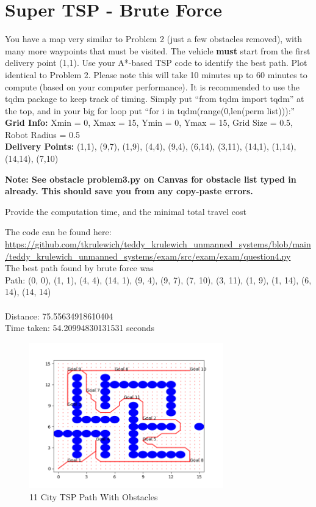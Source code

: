 \documentclass{article}
\begin{document}
\section{Super TSP - Brute Force}

You have a map very similar to Problem 2 (just a few obstacles removed),
with many more waypoints that must be visited. The vehicle \textbf{must} start from the first delivery point
(1,1). Use your A*-based TSP code to identify the best path. Plot identical to Problem 2. Please note
this will take 10 minutes up to 60 minutes to compute (based on your computer performance). It is
recommended to use the tqdm package to keep track of timing. Simply put “from tqdm import tqdm”
at the top, and in your big for loop put “for i in tqdm(range(0,len(perm list))):” \\

\bigskip
\noindent\textbf{Grid Info:} Xmin = 0, Xmax = 15, Ymin = 0, Ymax = 15, Grid Size = 0.5, Robot Radius = 0.5 \\
\textbf{Delivery Points:} (1,1), (9,7), (1,9), (4,4), (9,4), (6,14), (3,11), (14,1), (1,14), (14,14), (7,10)

\bigskip
\noindent\textbf{Note: See obstacle problem3.py on Canvas for obstacle list typed in already. This should
save you from any copy-paste errors.}

\bigskip
\noindent Provide the computation time, and the minimal total travel cost

\bigskip
The code can be found here: \\
\url{https://github.com/tkrulewich/teddy_krulewich_unmanned_systems/blob/main/teddy_krulewich_unmanned_systems/exam/src/exam/exam/question4.py}
\\

\noindent The best path found by brute force was \\

\noindent Path: (0, 0), (1, 1), (4, 4), (14, 1), (9, 4), (9, 7), (7, 10), (3, 11), (1, 9), (1, 14), (6, 14), (14, 14) \\ \\
Distance: 75.55634918610404 \\
Time taken: 54.20994830131531 seconds

\begin{figure}[H]
\centering
\includegraphics[width=0.75\textwidth]{images/question4.png}
\caption*{11 City TSP Path With Obstacles}
\end{figure}
\end{document}
